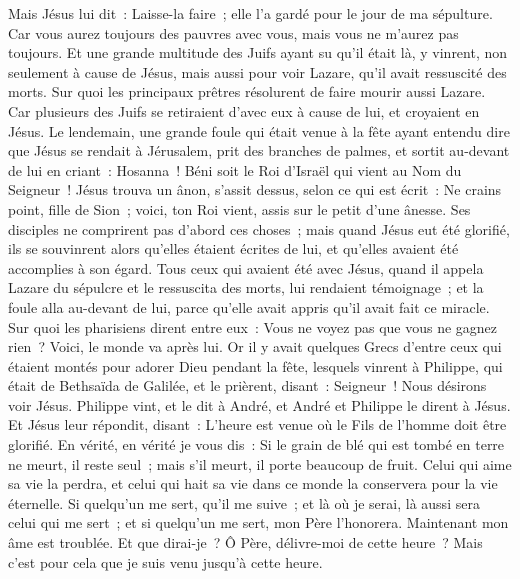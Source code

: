\begin{multicols}{2}
Mais Jésus lui dit~: Laisse-la faire~; elle l'a gardé pour le jour de ma sépulture.
Car vous aurez toujours des pauvres avec vous, mais vous ne m'aurez pas toujours.
Et une grande multitude des Juifs ayant su qu'il était là, y vinrent, non seulement à cause de Jésus, mais aussi pour voir Lazare, qu'il avait ressuscité des morts.
Sur quoi les principaux prêtres résolurent de faire mourir aussi Lazare.
Car plusieurs des Juifs se retiraient d'avec eux à cause de lui, et croyaient en Jésus.
Le lendemain, une grande foule qui était venue à la fête ayant entendu dire que Jésus se rendait à Jérusalem,
prit des branches de palmes, et sortit au-devant de lui en criant~: Hosanna~! Béni soit le Roi d'Israël qui vient au Nom du Seigneur~!
Jésus trouva un ânon, s'assit dessus, selon ce qui est écrit~:
Ne crains point, fille de Sion~; voici, ton Roi vient, assis sur le petit d'une ânesse.
Ses disciples ne comprirent pas d'abord ces choses~; mais quand Jésus eut été glorifié, ils se souvinrent alors qu'elles étaient écrites de lui, et qu'elles avaient été accomplies à son égard.
Tous ceux qui avaient été avec Jésus, quand il appela Lazare du sépulcre et le ressuscita des morts, lui rendaient témoignage~;
et la foule alla au-devant de lui, parce qu'elle avait appris qu'il avait fait ce miracle.
Sur quoi les pharisiens dirent entre eux~: Vous ne voyez pas que vous ne gagnez rien~? Voici, le monde va après lui.
Or il y avait quelques Grecs d'entre ceux qui étaient montés pour adorer Dieu pendant la fête,
lesquels vinrent à Philippe, qui était de Bethsaïda de Galilée, et le prièrent, disant~: Seigneur~! Nous désirons voir Jésus.
Philippe vint, et le dit à André, et André et Philippe le dirent à Jésus.
Et Jésus leur répondit, disant~: L'heure est venue où le Fils de l'homme doit être glorifié.
En vérité, en vérité je vous dis~: Si le grain de blé qui est tombé en terre ne meurt, il reste seul~; mais s'il meurt, il porte beaucoup de fruit.
Celui qui aime sa vie la perdra, et celui qui hait sa vie dans ce monde la conservera pour la vie éternelle.
Si quelqu'un me sert, qu'il me suive~; et là où je serai, là aussi sera celui qui me sert~; et si quelqu'un me sert, mon Père l'honorera.
Maintenant mon âme est troublée. Et que dirai-je~? Ô Père, délivre-moi de cette heure~? Mais c'est pour cela que je suis venu jusqu'à cette heure.

\end{multicols}
